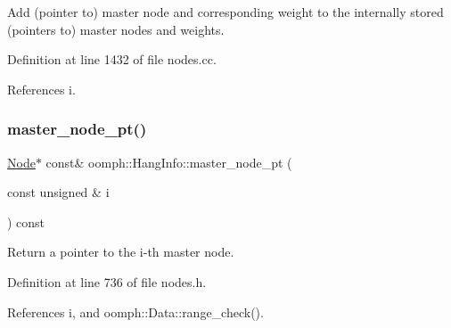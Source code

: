 Add (pointer to) master node and corresponding weight to the internally stored (pointers to) master nodes and weights. 

Definition at line 1432 of file nodes.\+cc.



References i.

\mbox{\label{classoomph_1_1HangInfo_a4983192a13d2ce3d12a454bd895b16e7}} 
\subsubsection{\texorpdfstring{master\+\_\+node\+\_\+pt()}{master\_node\_pt()}}
{\footnotesize\ttfamily \hyperlink{classoomph_1_1Node}{Node}$\ast$ const\& oomph\+::\+Hang\+Info\+::master\+\_\+node\+\_\+pt (\begin{DoxyParamCaption}\item[{const unsigned \&}]{i }\end{DoxyParamCaption}) const\hspace{0.3cm}{\ttfamily [inline]}}



Return a pointer to the i-\/th master node. 



Definition at line 736 of file nodes.\+h.



References i, and oomph\+::\+Data\+::range\+\_\+check().



